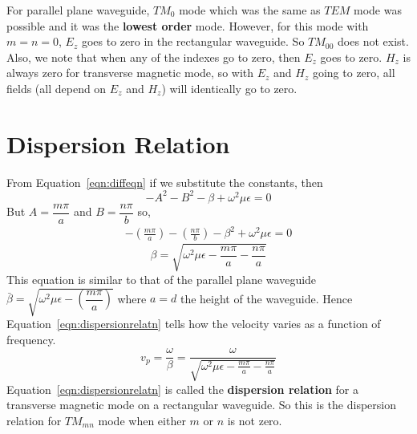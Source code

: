 For parallel plane waveguide, $TM_0$ mode which was the same as $TEM$ mode was possible and it was the \textbf{lowest order} mode. However, for this mode with $m=n=0$, $E_z$ goes to zero in the rectangular waveguide. So $TM_{00}$ does not exist. Also, we note that when any of the indexes go to zero, then $E_z$ goes to zero. $H_z$ is always zero for transverse magnetic mode, so with $E_z$ and $H_z$ going to zero, all fields (all depend on $E_z$ and $H_z$) will identically go to zero. 

\section{Dispersion Relation}
From Equation~\eqref{eqn:diffeqn} if we substitute the constants, then
\begin{dmath*}
-A^2 - B^2 - \beta + \omega^2\mu\epsilon = 0
\end{dmath*}
But $A=\dfrac{m\pi}{a}$ and $B=\dfrac{n\pi}{b}$ so,
\begin{align}
-\left(\frac{m\pi}{a}\right) - \left(\frac{n\pi}{b}\right) - \beta^{2} + {\omega^2\mu\epsilon} = 0
\label{eqn:hrec}
\end{align}
\begin{equation}
\beta = \sqrt{{\omega^2\mu\epsilon} - \frac{m\pi}{a} - \frac{n\pi}{a}}
\label{eqn:dispersionrelatn}
\end{equation}
This equation is similar to that of the parallel plane waveguide $\bar{\beta} = \sqrt{\omega^2\mu\epsilon - \left(\dfrac{m\pi}{a}\right)}$ where $a=d$ the height of the waveguide. Hence Equation~\eqref{eqn:dispersionrelatn} tells how the velocity varies as a function of frequency.
\begin{dmath*}
v_p = \frac{\omega}{\beta} = \frac{\omega}{\sqrt{{\omega^2\mu\epsilon} - \frac{m\pi}{a} - \frac{n\pi}{a}}}
\end{dmath*}
Equation~\eqref{eqn:dispersionrelatn} is called the \textbf{dispersion relation} for a transverse magnetic mode on a rectangular waveguide. So this is the dispersion relation for $TM_{mn}$ mode when either $m$ or $n$ is not zero. 

